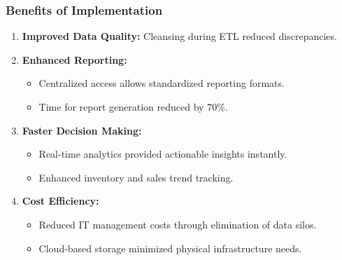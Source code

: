 \documentclass[aspectratio=169]{beamer}
\begin{document}
\begin{frame}[fragile]
    \frametitle{Benefits of Implementation}
    \begin{enumerate}
        \item \textbf{Improved Data Quality:} Cleansing during ETL reduced discrepancies.
        \item \textbf{Enhanced Reporting:}
            \begin{itemize}
                \item Centralized access allows standardized reporting formats.
                \item Time for report generation reduced by 70\%.
            \end{itemize}
        \item \textbf{Faster Decision Making:}
            \begin{itemize}
                \item Real-time analytics provided actionable insights instantly.
                \item Enhanced inventory and sales trend tracking.
            \end{itemize}
        \item \textbf{Cost Efficiency:}
            \begin{itemize}
                \item Reduced IT management costs through elimination of data silos.
                \item Cloud-based storage minimized physical infrastructure needs.
            \end{itemize}
    \end{enumerate}
\end{frame}
\end{document}
